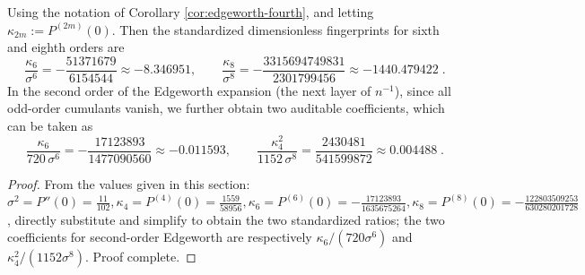 \begin{corollary}\label{cor:edgeworth-six-eight}
Using the notation of Corollary \ref{cor:edgeworth-fourth}, and letting
\(
\kappa_{2m}:=P^{(2m)}(0)
\).
Then the standardized dimensionless fingerprints for sixth and eighth orders are
$$
\boxed{\;
\frac{\kappa_6}{\sigma^6}=-\frac{51371679}{6154544}\approx -8.346951,
\qquad
\frac{\kappa_8}{\sigma^8}=-\frac{3315694749831}{2301799456}\approx -1440.479422\; }.
$$
In the second order of the Edgeworth expansion (the next layer of \(n^{-1}\)), since all odd-order cumulants vanish, we further obtain two auditable coefficients, which can be taken as
$$
\boxed{\;
\frac{\kappa_6}{720\,\sigma^6}=-\frac{17123893}{1477090560}\approx -0.011593,
\qquad
\frac{\kappa_4^2}{1152\,\sigma^8}=\frac{2430481}{541599872}\approx 0.004488\; }.
$$
\end{corollary}
\begin{proof}
From the values given in this section:
\(
\sigma^2=P''(0)=\frac{11}{102},
\kappa_4=P^{(4)}(0)=\frac{1559}{58956},
\kappa_6=P^{(6)}(0)=-\frac{17123893}{1635675264},
\kappa_8=P^{(8)}(0)=-\frac{122803509253}{630280201728}
\),
directly substitute and simplify to obtain the two standardized ratios;
the two coefficients for second-order Edgeworth are respectively \(\kappa_6/(720\sigma^6)\) and \(\kappa_4^2/(1152\sigma^8)\). Proof complete.
\end{proof}

